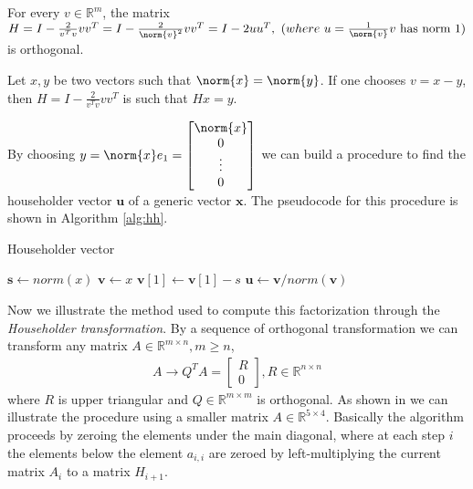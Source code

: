 \begin{lemma}
For every $v\in \mathbb{R}^m$, the matrix $H = I - \frac{2}{v^Tv}vv^T = I - \frac{2}{\norm{v}^2}vv^T
 = I - 2uu^T,\ (where\ u=\frac{1}{\norm{v}}v\text{ has norm 1})$ is orthogonal.
\end{lemma}
\begin{lemma}
Let $x, y$ be two vectors such that $\norm{x} = \norm{y}$. If one chooses $v=x-y$, then $H = I - \frac{2}{v^Tv}vv^T$ is such that $Hx = y$.
\end{lemma}
By choosing $y = \norm{x}e_1 = \begin{bmatrix}\norm{x}\\0\\ \vdots \\0\end{bmatrix}$ we can build a procedure to find the householder vector $\textbf{u}$ of a generic vector $\textbf{x}$. The pseudocode for this procedure is shown in Algorithm \ref{alg:hh}.
\begin{algorithm}[H]
	\caption{Householder vector}
	\label{alg:hh}
	\begin{algorithmic}[1]
		\State $\mathbf{s} \leftarrow norm(x)$
		\State $\mathbf{v} \leftarrow x$
		\State $\mathbf{v}[1] \leftarrow \mathbf{v}[1] - s$
		\State $\mathbf{u} \leftarrow \mathbf{v} / norm(\mathbf{v})$
	\end{algorithmic}
\end{algorithm}
Now we illustrate the method used to compute this factorization through the \textit{Householder transformation}. By a sequence of orthogonal transformation we can transform any matrix $A\in \mathbb{R}^{m\times n}, m\geq n$,
\begin{align*}
    A \to Q^TA = \begin{bmatrix}R \\ 0\end{bmatrix}, R \in \mathbb{R}^{n\times n}
\end{align*}
where $R$ is upper triangular and $Q\in \mathbb{R}^{m\times m}$ is orthogonal. As shown in \parencite[Chap. 5.1]{elden} we can illustrate the procedure using a smaller matrix $A\in \mathbb{R}^{5\times 4}$. Basically the algorithm proceeds by zeroing the elements under the main diagonal, where at each step $i$ the elements below the element $a_{i,i}$ are zeroed by left-multiplying the current matrix $A_i$ to a matrix $H_{i+1}$.

